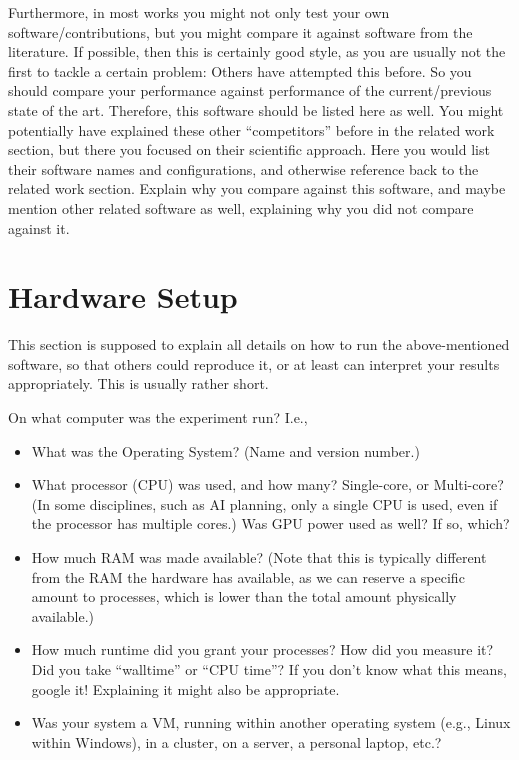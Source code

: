 Furthermore, in most works you might not only test your own software/contributions, but you might compare it against software from the literature. If possible, then this is certainly good style, as you are usually not the first to tackle a certain problem: Others have attempted this before. So you should compare your performance against performance of the current/previous state of the art. Therefore, this software should be listed here as well. You might potentially have explained these other ``competitors'' before in the related work section, but there you focused on their scientific approach. Here you would list their software names and configurations, and otherwise reference back to the related work section. Explain why you compare against this software, and maybe mention other related software as well, explaining why you did not compare against it.


\section{Hardware Setup}

This section is supposed to explain all details on how to run the above-mentioned software, so that others could reproduce it, or at least can interpret your results appropriately. This is usually rather short.

On what computer was the experiment run? I.e., 
\begin{itemize}
  \item What was the Operating System? (Name and version number.)
  \item What processor (CPU) was used, and how many? Single-core, or Multi-core? (In some disciplines, such as AI planning, only a single CPU is used, even if the processor has multiple cores.) Was GPU power used as well? If so, which?
  \item How much RAM was made available? (Note that this is typically different from the RAM the hardware has available, as we can reserve a specific amount to processes, which is lower than the total amount physically available.)
  \item How much runtime did you grant your processes? How did you measure it? Did you take ``walltime'' or ``CPU time''? If you don't know what this means, google it! Explaining it might also be appropriate.
  \item Was your system a VM, running within another operating system (e.g., Linux within Windows), in a cluster, on a server, a personal laptop, etc.?
\end{itemize}

